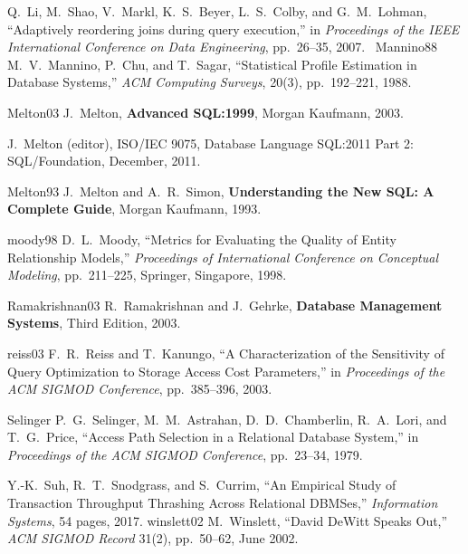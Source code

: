 \documentclass[prodmode,acmtods]{acmsmall}
\begin{document}
{\begin{thebibliography}{99}
Q.~Li, M.~Shao, V.~Markl, K.~S.~Beyer, L.~S.~Colby, and G.~M.~Lohman,
``Adaptively reordering joins during query execution,'' in {\em Proceedings
  of the IEEE International Conference on Data Engineering}, pp.~26--35, 2007.\
\bibitem
{Mannino88}
M.~V.~Mannino, P.~Chu, and T.~Sagar, ``Statistical Profile Estimation in
Database Systems,'' {\em ACM Computing Surveys}, 20(3), pp.~192--221, 1988.

\bibitem
{Melton03}
J.~Melton, {\bf Advanced SQL:1999}, Morgan Kaufmann, 2003.

J.~Melton (editor), ISO/IEC 9075, Database Language SQL:2011 Part 2:
SQL/Foundation, December, 2011.

\bibitem
{Melton93}
J.~Melton and A.~R.~Simon, {\bf Understanding the New SQL: A Complete
  Guide}, Morgan Kaufmann, 1993.

\bibitem
{moody98} D.~L.~Moody, ``Metrics for Evaluating the Quality of Entity
Relationship Models,'' {\em Proceedings of International Conference on
  Conceptual Modeling}, pp.~211--225, Springer, Singapore, 1998.

\bibitem
{Ramakrishnan03}
R.~Ramakrishnan and J.~Gehrke, {\bf Database Management Systems}, Third
Edition, 2003.

\bibitem
{reiss03}
F.~R.~Reiss and T.~Kanungo, ``A Characterization of the Sensitivity of Query
Optimization to Storage Access Cost Parameters,'' in {\em Proceedings of the
  ACM SIGMOD Conference}, pp.~385--396, 2003.

\bibitem
{Selinger}
P.~G.~Selinger, M.~M.~Astrahan, D.~D.~Chamberlin, R.~A.~Lori, and
T.~G.~Price, ``Access Path Selection in a Relational Database System,''
in {\em Proceedings of the ACM SIGMOD Conference}, pp.~23--34, 1979.

Y.-K.~Suh, R.~T.~Snodgrass, and S.~Currim, ``An Empirical Study
of Transaction Throughput Thrashing Across Relational DBMSes,''
{\em Information Systems}, 54 pages, 2017.
\bibitem
{winslett02}
M.~Winslett, ``David DeWitt Speaks Out,'' {\em ACM SIGMOD
  Record} 31(2), pp.~50--62, June 2002. 

\end{thebibliography}
}
\end{document}
